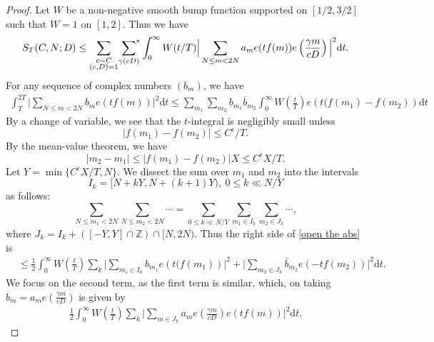 \documentclass[12pt,a4paper,twoside, reqno]{amsart}
\newcommand{\sumstar}{\sideset{}{^*}\sum}
\begin{document}
\begin{proof}
Let $W$ be a non-negative smooth bump  function supported on $[1/2,3/2]$ such that $W=1$ on $[1,2]$. Thus we have 
  \begin{align*}
   S_T(C,N;D) \leq  \mathop{\sum_{\substack{c \sim C \\ (c,D)=1}}}\sumstar_{\gamma (cD)} \int_{0}^{\infty}W(t/T) \Big|\sum_{N \leq m <  2N} a_m  e(tf(m)) e\left( \frac{\gamma m}{cD} \right) \Big| ^2\mathrm{d}t.
\end{align*}
For any sequence of complex numbers $(b_m)$, we have 
\begin{align}\label{open the abs}
    \int_{T}^{2T } \Big|\sum_{N \leq m <  2N} b_m  e(tf(m))  \Big| ^2\mathrm{d}t \leq  \sum_{m_1}  \sum_{m_2}b_{m_1} \overline{b}_{m_2} \int_{0}^{\infty} W\left( \frac{t}{T} \right) e\left( t(f(m_1)-f(m_2) \right)  \mathrm{d}t 
\end{align}
 By a change of variable, we see that the $t$-integral is negligibly small unless $$ |f(m_1)-f(m_2)| \leq C^{\epsilon}/T. $$ 
 By the mean-value theorem, we have
 \[|m_2-m_1| \leq {|f(m_1)-f(m_2)|X} \leq {C^\epsilon X}/{T}.\]
Let $Y=\min\{C^\epsilon X/T,N \}$. We dissect the sum over $m_1$ and $m_2$ into the intervals $$I_k=[N+kY,N+(k+1)Y), \ 0 \leq k \ll N/Y $$   as follows:
\[    \sum_{N \leq m_1<2N}  \sum_{N \leq m_2 <2N}\cdots = \sum_{0\leq k\ll N/Y}\sum_{m_1 \in I_k} \sum_{m_2 \in J_k} \cdots,\]
where $J_k=I_k+([-Y,Y]\cap \mathbb{Z})\cap [N,2N).$
Thus the right side of \eqref{open the abs} is 
\begin{align*}
   &\leq \frac{1}{2} \int_{0}^{\infty} W\left( \frac{t}{T} \right) \sum_k \Big| \sum_{m_1 \in I_k} b_{m_1} e\left( t(f(m_1) \right) \Big|^2+\Big|\sum_{m_2 \in J_k} \bar{b}_{m_2} e\left( -tf(m_2) \right) \Big|^2\mathrm{d}t.
     \end{align*}
We focus on the second term, as the first term is similar, which, on taking  $b_m=a_m e\left(\frac{\gamma m}{cD}\right)$ is given by 
\begin{align*}
    \frac{1}{2} \int_{0}^{\infty} W\left( \frac{t}{T} \right) \sum_k \Big|\sum_{m \in J_k} a_m e\left(\frac{\gamma m}{cD}\right) e\left( tf(m) \right) \Big|^2\mathrm{d}t.

\end{align*}
\end{proof}
\end{document}
